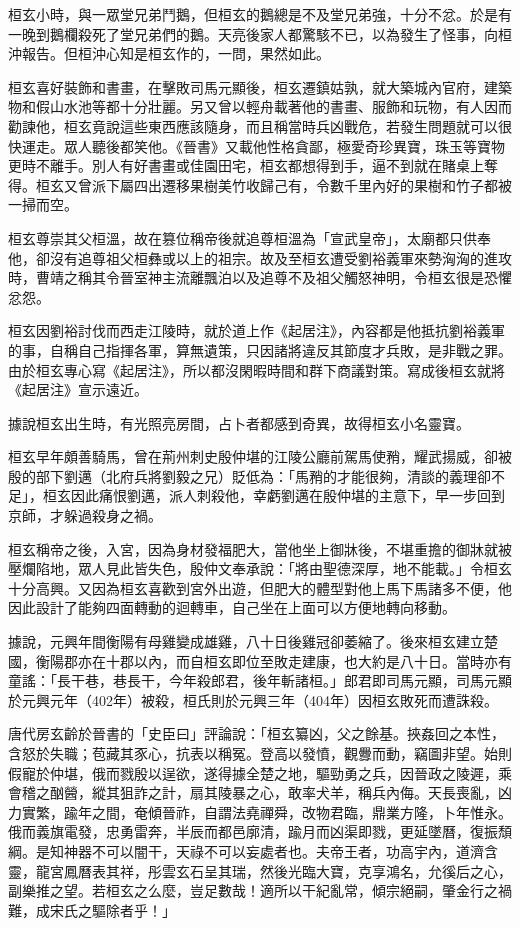 桓玄小時，與一眾堂兄弟鬥鵝，但桓玄的鵝總是不及堂兄弟強，十分不忿。於是有一晚到鵝欄殺死了堂兄弟們的鵝。天亮後家人都驚駭不已，以為發生了怪事，向桓沖報告。但桓沖心知是桓玄作的，一問，果然如此。

桓玄喜好裝飾和書畫，在擊敗司馬元顯後，桓玄遷鎮姑孰，就大築城內官府，建築物和假山水池等都十分壯麗。另又曾以輕舟載著他的書畫、服飾和玩物，有人因而勸諫他，桓玄竟說這些東西應該隨身，而且稱當時兵凶戰危，若發生問題就可以很快運走。眾人聽後都笑他。《晉書》又載他性格貪鄙，極愛奇珍異寶，珠玉等寶物更時不離手。別人有好書畫或佳園田宅，桓玄都想得到手，逼不到就在賭桌上奪得。桓玄又曾派下屬四出遷移果樹美竹收歸己有，令數千里內好的果樹和竹子都被一掃而空。

桓玄尊崇其父桓溫，故在篡位稱帝後就追尊桓溫為「宣武皇帝」，太廟都只供奉他，卻沒有追尊祖父桓彝或以上的祖宗。故及至桓玄遭受劉裕義軍來勢洶洶的進攻時，曹靖之稱其令晉室神主流離飄泊以及追尊不及祖父觸怒神明，令桓玄很是恐懼忿怨。

桓玄因劉裕討伐而西走江陵時，就於道上作《起居注》，內容都是他抵抗劉裕義軍的事，自稱自己指揮各軍，算無遺策，只因諸將違反其節度才兵敗，是非戰之罪。由於桓玄專心寫《起居注》，所以都沒閑暇時間和群下商議對策。寫成後桓玄就將《起居注》宣示遠近。

據說桓玄出生時，有光照亮房間，占卜者都感到奇異，故得桓玄小名靈寶。

桓玄早年頗善騎馬，曾在荊州刺史殷仲堪的江陵公廳前駕馬使矟，耀武揚威，卻被殷的部下劉邁（北府兵將劉毅之兄）貶低為：「馬矟的才能很夠，清談的義理卻不足」，桓玄因此痛恨劉邁，派人刺殺他，幸虧劉邁在殷仲堪的主意下，早一步回到京師，才躲過殺身之禍。

桓玄稱帝之後，入宮，因為身材發福肥大，當他坐上御牀後，不堪重擔的御牀就被壓爛陷地，眾人見此皆失色，殷仲文奉承說：「將由聖德深厚，地不能載。」令桓玄十分高興。又因為桓玄喜歡到宮外出遊，但肥大的體型對他上馬下馬諸多不便，他因此設計了能夠四面轉動的迴轉車，自己坐在上面可以方便地轉向移動。

據說，元興年間衡陽有母雞變成雄雞，八十日後雞冠卻萎縮了。後來桓玄建立楚國，衡陽郡亦在十郡以內，而自桓玄即位至敗走建康，也大約是八十日。當時亦有童謠：「長干巷，巷長干，今年殺郎君，後年斬諸桓。」郎君即司馬元顯，司馬元顯於元興元年（402年）被殺，桓氏則於元興三年（404年）因桓玄敗死而遭誅殺。

唐代房玄齡於晉書的「史臣曰」評論說：「桓玄纂凶，父之餘基。挾姦回之本性，含怒於失職；苞藏其豕心，抗表以稱冤。登高以發憤，觀釁而動，竊圖非望。始則假寵於仲堪，俄而戮殷以逞欲，遂得據全楚之地，驅勁勇之兵，因晉政之陵遲，乘會稽之酗醟，縱其狙詐之計，扇其陵暴之心，敢率犬羊，稱兵內侮。天長喪亂，凶力實繁，踰年之間，奄傾晉祚，自謂法堯禪舜，改物君臨，鼎業方隆，卜年惟永。俄而義旗電發，忠勇雷奔，半辰而都邑廓清，踰月而凶渠即戮，更延墜曆，復振頹綱。是知神器不可以闇干，天祿不可以妄處者也。夫帝王者，功高宇內，道濟含靈，龍宮鳳曆表其祥，彤雲玄石呈其瑞，然後光臨大寶，克享鴻名，允徯后之心，副樂推之望。若桓玄之么麼，豈足數哉！適所以干紀亂常，傾宗絕嗣，肇金行之禍難，成宋氏之驅除者乎！」

